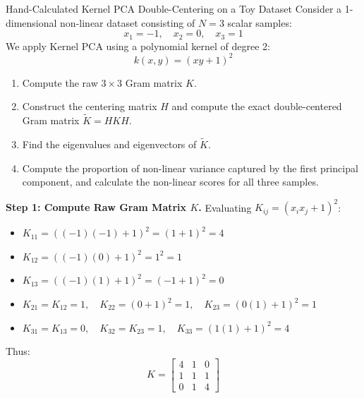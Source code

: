 \begin{examplebox}{Hand-Calculated Kernel PCA Double-Centering on a Toy Dataset}
Consider a 1-dimensional non-linear dataset consisting of $N = 3$ scalar samples:
\begin{equation}
x_1 = -1, \quad x_2 = 0, \quad x_3 = 1
\end{equation}
We apply Kernel PCA using a polynomial kernel of degree 2:
\begin{equation}
k(x, y) = (x y + 1)^2
\end{equation}
\begin{enumerate}
    \item Compute the raw $3 \times 3$ Gram matrix $K$.
    \item Construct the centering matrix $H$ and compute the exact double-centered Gram matrix $\tilde{K} = H K H$.
    \item Find the eigenvalues and eigenvectors of $\tilde{K}$.
    \item Compute the proportion of non-linear variance captured by the first principal component, and calculate the non-linear scores for all three samples.
\end{enumerate}

\textbf{Step 1: Compute Raw Gram Matrix $K$.}
Evaluating $K_{ij} = (x_i x_j + 1)^2$:
\begin{itemize}
    \item $K_{11} = ((-1)(-1) + 1)^2 = (1 + 1)^2 = 4$
    \item $K_{12} = ((-1)(0) + 1)^2 = 1^2 = 1$
    \item $K_{13} = ((-1)(1) + 1)^2 = (-1 + 1)^2 = 0$
    \item $K_{21} = K_{12} = 1, \quad K_{22} = (0 + 1)^2 = 1, \quad K_{23} = (0(1) + 1)^2 = 1$
    \item $K_{31} = K_{13} = 0, \quad K_{32} = K_{23} = 1, \quad K_{33} = (1(1) + 1)^2 = 4$
\end{itemize}
Thus:
\begin{equation}
K = \begin{bmatrix} 4 & 1 & 0 \\ 1 & 1 & 1 \\ 0 & 1 & 4 \end{bmatrix}
\end{equation}


\end{examplebox}
